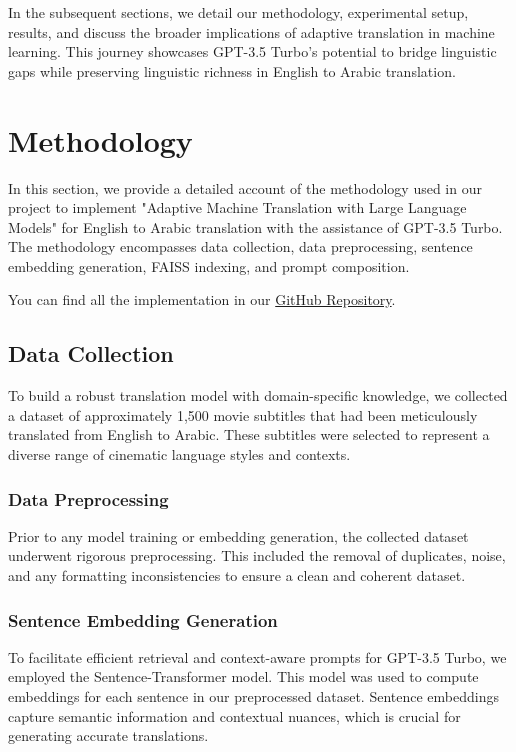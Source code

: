 \documentclass[12pt]{article}
\begin{document}
In the subsequent sections, we detail our methodology, experimental setup, results, and discuss the broader implications of adaptive translation in machine learning. This journey showcases GPT-3.5 Turbo's potential to bridge linguistic gaps while preserving linguistic richness in English to Arabic translation.


\section{Methodology}

In this section, we provide a detailed account of the methodology used in our project to implement "Adaptive Machine Translation with Large Language Models" for English to Arabic translation with the assistance of GPT-3.5 Turbo. The methodology encompasses data collection, data preprocessing, sentence embedding generation, FAISS indexing, and prompt composition.

You can find all the implementation in our \href{https://github.com/mhannani/Adaptive_Machine_translation_with_LLMs/}{GitHub Repository}.





\subsection{Data Collection}

To build a robust translation model with domain-specific knowledge, we collected a dataset of approximately 1,500 movie subtitles that had been meticulously translated from English to Arabic. These subtitles were selected to represent a diverse range of cinematic language styles and contexts.


\subsubsection{Data Preprocessing}
Prior to any model training or embedding generation, the collected dataset underwent rigorous preprocessing. This included the removal of duplicates, noise, and any formatting inconsistencies to ensure a clean and coherent dataset.



\subsubsection{Sentence Embedding Generation}
To facilitate efficient retrieval and context-aware prompts for GPT-3.5 Turbo, we employed the Sentence-Transformer model. This model was used to compute embeddings for each sentence in our preprocessed dataset. Sentence embeddings capture semantic information and contextual nuances, which is crucial for generating accurate translations.
\end{document}
